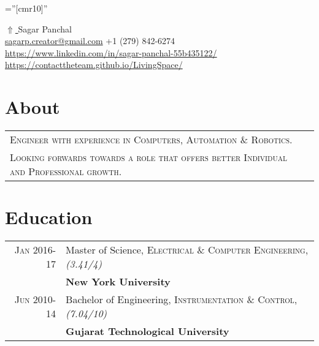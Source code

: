 \documentclass[a4paper]{article}
\begin{document}
\pagestyle{empty} 						%
\font\fb=''[cmr10]'' 						%

\par{\centering
		 \href{https://contacttheteam.github.io/LivingSpace/}{$ \Uparrow$ }  
		 {\Large Sagar Panchal\textsc{}}\\
		{\small \href{mailto:sagarp.creator@gmail.com}{sagarp.creator@gmail.com} 
		\textbullet \textsc{ +1 (279) 842-6274}
		}\\
		\small \href{https://www.linkedin.com/in/sagar-panchal-55b435122/}{https://www.linkedin.com/in/sagar-panchal-55b435122/}
		\textbullet \small \href{https://contacttheteam.github.io/LivingSpace/}{https://contacttheteam.github.io/LivingSpace/}
\par}

\section{About}
\begin{tabular}{ll}
\textsc{Engineer with experience in Computers,  Automation \& Robotics.}\\
\textsc{Looking forwards towards a role that offers better Individual and Professional growth.}\\
\end{tabular}

\section{Education}
\begin{tabular}{rl}
\small{}\textsc{Jan 2016-17} & Master of Science, \textsc{ Electrical \& Computer Engineering}, \emph {(3.41/4)}\\
 & \small{}\textbf{New York University}\\
 \small{}\textsc{Jun 2010-14} & Bachelor of Engineering, \textsc{Instrumentation \& Control}, \emph {(7.04/10)}\\
 & \small{}\textbf{Gujarat Technological University}
\end{tabular}

\end{document}
